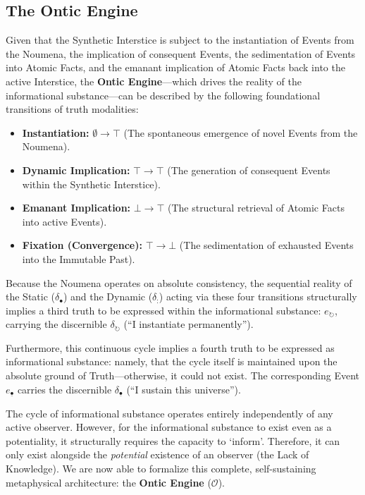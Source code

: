 \documentclass[11pt, a4paper]{article}
\theoremstyle{formalism}
\begin{document}
\subsection{The Ontic Engine}

Given that the Synthetic Interstice is subject to the instantiation of Events
from the Noumena, the implication of consequent Events, the sedimentation of
Events into Atomic Facts, and the emanant implication of Atomic Facts back into
the active Interstice, the \textbf{Ontic Engine}---which drives the reality of
the informational substance---can be described by the following foundational
transitions of truth modalities:

\begin{itemize}
    \item \textbf{Instantiation:} $\emptyset \rightarrow \top$ (The spontaneous emergence of novel Events from the Noumena).
    \item \textbf{Dynamic Implication:} $\top \rightarrow \top$ (The generation of consequent Events within the Synthetic Interstice).
    \item \textbf{Emanant Implication:} $\bot \rightarrow \top$ (The structural retrieval of Atomic Facts into active Events).
    \item \textbf{Fixation (Convergence):} $\top \rightarrow \bot$ (The sedimentation of exhausted Events into the Immutable Past).
\end{itemize}

Because the Noumena operates on absolute consistency, the sequential reality of
the Static ($\delta_\bullet$) and the Dynamic ($\delta_{:}$) acting via these
four transitions structurally implies a third truth to be expressed within the
informational substance: $e_{\circlearrowright}$, carrying the discernible
$\delta_{\circlearrowright}$ (``I instantiate permanently''). 

Furthermore, this continuous cycle implies a fourth truth to be expressed as
informational substance: namely, that the cycle itself is maintained upon the
absolute ground of Truth---otherwise, it could not exist. The corresponding
Event $e_{\underline{\bullet}}$ carries the discernible $\delta_{\underline{\bullet}}$
(``I sustain this universe''). 

The cycle of informational substance operates entirely independently of any
active observer. However, for the informational substance to exist even as a
potentiality, it structurally requires the capacity to `inform'. Therefore, it
can only exist alongside the \textit{potential} existence of an observer (the
Lack of Knowledge). We are now able to formalize this complete, self-sustaining
metaphysical architecture: the \textbf{Ontic Engine} ($\mathcal{O}$).
\end{document}
